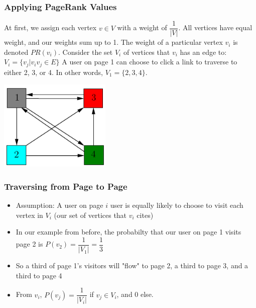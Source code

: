 \documentclass{beamer}
\begin{document}
\begin{frame}[t]
\frametitle{Applying PageRank Values}
\begin{outline}
    \1 At first, we assign each vertex $v\in V$ with a weight of $\dfrac{1}{|V|}$. 
    \1 All vertices have equal weight, and our weights sum up to 1. The weight of a particular vertex $v_i$ is denoted $PR(v_i)$.
    \1 Consider the set $V_i$ of vertices that $v_i$ has an edge to:
        \2 $V_i = \{v_j | v_iv_j \in E\}$
    \1 A user on page 1 can choose to click a link to traverse to either 2, 3, or 4. In other words, $V_1 = \{2, 3, 4\}$.
\end{outline}
\begin{center}
    \includegraphics[width=0.4\textwidth]{unweighted.png}
\end{center}
\end{frame}

\begin{frame}[t]
\frametitle{Traversing from Page to Page}
\begin{itemize}
    \setlength\itemsep{1em}
    \item Assumption: A user on page $i$ user is equally likely to choose to visit each vertex in $V_i$ (our set of vertices that $v_i$ cites)
    \item In our example from before, the probabilty that our user on page 1 visits page 2 is $P(v_2) = \dfrac{1}{|V_1|} = \dfrac{1}{3}$
    \item So a third of page 1's visitors will "flow" to page 2, a third to page 3, and a third to page 4
    \item From $v_i$, $P(v_j) = \dfrac{1}{|V_i|}$ if $v_j \in V_i$, and 0 else.
\end{itemize}
\end{frame}
\end{document}
